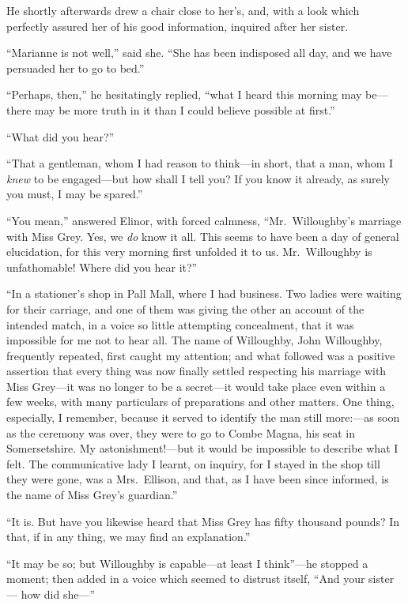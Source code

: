 He shortly afterwards drew a chair close to her's,
and, with a look which perfectly assured her of his
good information, inquired after her sister.

``Marianne is not well,'' said she.  ``She has been
indisposed all day, and we have persuaded her to go to bed.''

``Perhaps, then,'' he hesitatingly replied, ``what I
heard this morning may be---there may be more truth in it
than I could believe possible at first.''

``What did you hear?''

``That a gentleman, whom I had reason to think---in short,
that a man, whom I \emph{knew} to be engaged---but how shall I
tell you?  If you know it already, as surely you must,
I may be spared.''

``You mean,'' answered Elinor, with forced calmness,
``Mr.\ Willoughby's marriage with Miss Grey.  Yes, we \emph{do}
know it all.  This seems to have been a day of general
elucidation, for this very morning first unfolded it to us.
Mr.\ Willoughby is unfathomable!  Where did you hear it?''

``In a stationer's shop in Pall Mall, where I
had business.  Two ladies were waiting for their carriage,
and one of them was giving the other an account of the
intended match, in a voice so little attempting concealment,
that it was impossible for me not to hear all.  The name
of Willoughby, John Willoughby, frequently repeated,
first caught my attention; and what followed was a positive
assertion that every thing was now finally settled
respecting his marriage with Miss Grey---it was no longer
to be a secret---it would take place even within a few weeks,
with many particulars of preparations and other matters.
One thing, especially, I remember, because it served
to identify the man still more:---as soon as the ceremony
was over, they were to go to Combe Magna, his seat
in Somersetshire.  My astonishment!---but it would be
impossible to describe what I felt.  The communicative
lady I learnt, on inquiry, for I stayed in the shop
till they were gone, was a Mrs.\ Ellison, and that, as I
have been since informed, is the name of Miss Grey's guardian.''

``It is.  But have you likewise heard that Miss Grey
has fifty thousand pounds?  In that, if in any thing,
we may find an explanation.''

``It may be so; but Willoughby is capable---at least
I think''---he stopped a moment; then added in a voice
which seemed to distrust itself, ``And your sister---%
how did she---''

